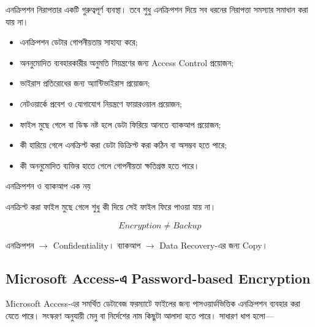 এনক্রিপশন নিরাপত্তার একটি গুরুত্বপূর্ণ ব্যবস্থা। তবে শুধু এনক্রিপশন দিয়ে সব ধরনের
নিরাপত্তা সমস্যার সমাধান করা যায় না।

\begin{itemize}

    \item এনক্রিপশন ডেটার গোপনীয়তায় সাহায্য করে;

    \item অননুমোদিত ব্যবহারকারীর অনুমতি নিয়ন্ত্রণের জন্য
          Access Control প্রয়োজন;

    \item ভাইরাস প্রতিরোধের জন্য অ্যান্টিভাইরাস প্রয়োজন;

    \item নেটওয়ার্কে প্রবেশ ও যোগাযোগ নিয়ন্ত্রণে ফায়ারওয়াল প্রয়োজন;

    \item ফাইল মুছে গেলে বা ডিস্ক নষ্ট হলে ডেটা ফিরিয়ে আনতে
          ব্যাকআপ প্রয়োজন;

    \item কী হারিয়ে গেলে এনক্রিপ্ট করা ডেটা ডিক্রিপ্ট করা কঠিন বা
          অসম্ভব হতে পারে;

    \item কী অননুমোদিত ব্যক্তির হাতে গেলে গোপনীয়তা ক্ষতিগ্রস্ত
          হতে পারে।

\end{itemize}


\begin{mistakebox}{এনক্রিপশন ও ব্যাকআপ এক নয়}

এনক্রিপ্ট করা ফাইল মুছে গেলে শুধু কী দিয়ে সেই ফাইল ফিরে পাওয়া যায় না।

\[
\boxed{
Encryption
\neq
Backup
}
\]

এনক্রিপশন $\rightarrow$ Confidentiality। ব্যাকআপ $\rightarrow$ Data Recovery-এর জন্য Copy।

\end{mistakebox}



\subsection{Microsoft Access-এ Password-based Encryption}

Microsoft Access-এর সমর্থিত ডেটাবেজ ফরম্যাটে ফাইলের জন্য পাসওয়ার্ডভিত্তিক এনক্রিপশন ব্যবহার করা যেতে পারে। সংস্করণ অনুযায়ী মেনু বা নির্দেশের নাম কিছুটা আলাদা হতে পারে। সাধারণ ধাপ হলো---

